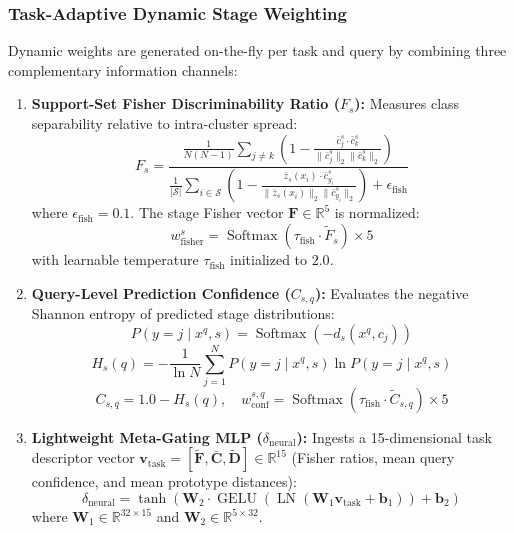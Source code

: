 \documentclass[conference]{IEEEtran}
\begin{document}
\subsubsection{Task-Adaptive Dynamic Stage Weighting}
Dynamic weights are generated on-the-fly per task and query by combining three complementary information channels:
\begin{enumerate}
    \item \textbf{Support-Set Fisher Discriminability Ratio ($F_s$):} Measures class separability relative to intra-cluster spread:
    \begin{equation}
        F_s = \frac{\frac{1}{N(N-1)} \sum_{j \neq k} \left(1 - \frac{\bar{c}_j^s \cdot \bar{c}_k^s}{\|\bar{c}_j^s\|_2 \|\bar{c}_k^s\|_2}\right)}{\frac{1}{|\mathcal{S}|} \sum_{i \in \mathcal{S}} \left(1 - \frac{\bar{z}_s(x_i) \cdot \bar{c}_{y_i}^s}{\|\bar{z}_s(x_i)\|_2 \|\bar{c}_{y_i}^s\|_2}\right) + \epsilon_{\text{fish}}}
    \end{equation}
    where $\epsilon_{\text{fish}} = 0.1$. The stage Fisher vector $\mathbf{F} \in \mathbb{R}^5$ is normalized:
    \begin{equation}
        w_{\text{fisher}}^s = \operatorname{Softmax}\left(\tau_{\text{fish}} \cdot \tilde{F}_s\right) \times 5
    \end{equation}
    with learnable temperature $\tau_{\text{fish}}$ initialized to $2.0$.
    \item \textbf{Query-Level Prediction Confidence ($C_{s,q}$):} Evaluates the negative Shannon entropy of predicted stage distributions:
    \begin{equation}
        P(y = j \mid x^q, s) = \operatorname{Softmax}\left(-d_s(x^q, c_j)\right)
    \end{equation}
    \begin{equation}
        H_s(q) = -\frac{1}{\ln N} \sum_{j=1}^N P(y=j \mid x^q, s) \ln P(y=j \mid x^q, s)
    \end{equation}
    \begin{equation}
        C_{s,q} = 1.0 - H_s(q), \quad w_{\text{conf}}^{s,q} = \operatorname{Softmax}\left(\tau_{\text{fish}} \cdot \tilde{C}_{s,q}\right) \times 5
    \end{equation}
    \item \textbf{Lightweight Meta-Gating MLP ($\delta_{\text{neural}}$):} Ingests a 15-dimensional task descriptor vector $\mathbf{v}_{\text{task}} = [\tilde{\mathbf{F}}, \bar{\mathbf{C}}, \tilde{\mathbf{D}}] \in \mathbb{R}^{15}$ (Fisher ratios, mean query confidence, and mean prototype distances):
    \begin{equation}
        \delta_{\text{neural}} = \tanh\left(\mathbf{W}_2 \cdot \operatorname{GELU}\left(\operatorname{LN}\left(\mathbf{W}_1 \mathbf{v}_{\text{task}} + \mathbf{b}_1\right)\right) + \mathbf{b}_2\right)
    \end{equation}
    where $\mathbf{W}_1 \in \mathbb{R}^{32 \times 15}$ and $\mathbf{W}_2 \in \mathbb{R}^{5 \times 32}$.
\end{enumerate}
\end{document}
